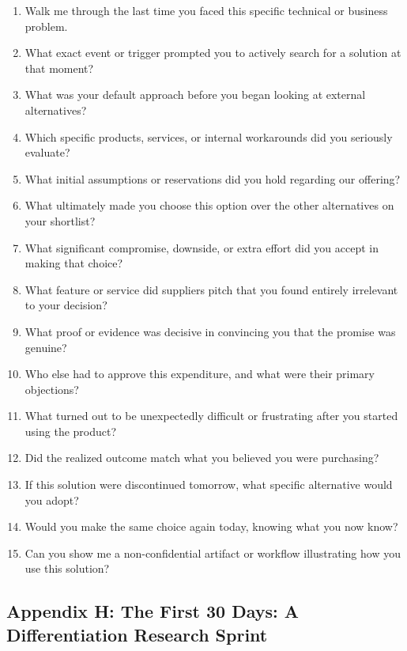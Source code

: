 \begin{enumerate}
    \item Walk me through the last time you faced this specific technical or business problem.
    \item What exact event or trigger prompted you to actively search for a solution at that moment?
    \item What was your default approach before you began looking at external alternatives?
    \item Which specific products, services, or internal workarounds did you seriously evaluate?
    \item What initial assumptions or reservations did you hold regarding our offering?
    \item What ultimately made you choose this option over the other alternatives on your shortlist?
    \item What significant compromise, downside, or extra effort did you accept in making that choice?
    \item What feature or service did suppliers pitch that you found entirely irrelevant to your decision?
    \item What proof or evidence was decisive in convincing you that the promise was genuine?
    \item Who else had to approve this expenditure, and what were their primary objections?
    \item What turned out to be unexpectedly difficult or frustrating after you started using the product?
    \item Did the realized outcome match what you believed you were purchasing?
    \item If this solution were discontinued tomorrow, what specific alternative would you adopt?
    \item Would you make the same choice again today, knowing what you now know?
    \item Can you show me a non-confidential artifact or workflow illustrating how you use this solution?
\end{enumerate}

\subsection*{Appendix H: The First 30 Days: A Differentiation Research Sprint}

